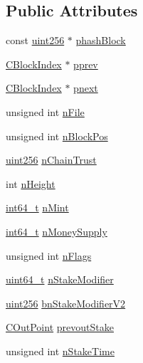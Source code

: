 \subsection*{Public Attributes}
\begin{DoxyCompactItemize}
\item 
const \hyperlink{classuint256}{uint256} $\ast$ \hyperlink{class_c_block_index_afac8099e03ffda463c7153ca82d37b66}{phash\+Block}
\item 
\hyperlink{class_c_block_index}{C\+Block\+Index} $\ast$ \hyperlink{class_c_block_index_a1ef11137155df1dd5c81491630cece39}{pprev}
\item 
\hyperlink{class_c_block_index}{C\+Block\+Index} $\ast$ \hyperlink{class_c_block_index_a2f0acd342accaab731d887584b444590}{pnext}
\item 
unsigned int \hyperlink{class_c_block_index_a3bf9ecd8938c42be6a4b14d3c7ef5c21}{n\+File}
\item 
unsigned int \hyperlink{class_c_block_index_af8de5426e2da2c78e1e7729a89a7670a}{n\+Block\+Pos}
\item 
\hyperlink{classuint256}{uint256} \hyperlink{class_c_block_index_aa11268e5a01c5a7d33fb313fb0494015}{n\+Chain\+Trust}
\item 
int \hyperlink{class_c_block_index_aebfc8d6b95852546760e742553d7bfd5}{n\+Height}
\item 
\hyperlink{stdint_8h_adec1df1b8b51cb32b77e5b86fff46471}{int64\+\_\+t} \hyperlink{class_c_block_index_a6559fddea3401548ae144e870d150359}{n\+Mint}
\item 
\hyperlink{stdint_8h_adec1df1b8b51cb32b77e5b86fff46471}{int64\+\_\+t} \hyperlink{class_c_block_index_a309fdc44d871b336abe64eadf250cafd}{n\+Money\+Supply}
\item 
unsigned int \hyperlink{class_c_block_index_a02aaba7d27ec615e6f9f740353d839de}{n\+Flags}
\item 
\hyperlink{stdint_8h_aaa5d1cd013383c889537491c3cfd9aad}{uint64\+\_\+t} \hyperlink{class_c_block_index_a2aa226c04d79a4d932ed6eb0abd02cbe}{n\+Stake\+Modifier}
\item 
\hyperlink{classuint256}{uint256} \hyperlink{class_c_block_index_aa8c9b5c3316413a332d5dea243c2c2c9}{bn\+Stake\+Modifier\+V2}
\item 
\hyperlink{class_c_out_point}{C\+Out\+Point} \hyperlink{class_c_block_index_ac2c040d5e3db73a5ceb87ee4095a405f}{prevout\+Stake}
\item 
unsigned int \hyperlink{class_c_block_index_ae6870336a5bf237680502fa067262af8}{n\+Stake\+Time}
\item 

\end{DoxyCompactItemize}
